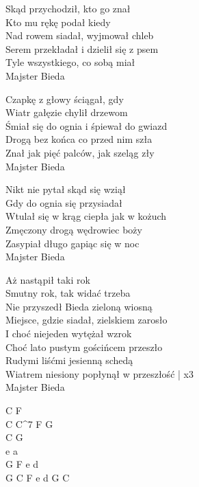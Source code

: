 
\begin{text}
    Skąd przychodził, kto go znał\\
    Kto mu rękę podał kiedy\\
    Nad rowem siadał, wyjmował chleb\\
    Serem przekładał i dzielił się z psem\\
    Tyle wszystkiego, co sobą miał\\
    Majster Bieda

    Czapkę z głowy ściągał, gdy\\
    Wiatr gałęzie chylił drzewom\\
    Śmiał się do ognia i śpiewał do gwiazd\\
    Drogą bez końca co przed nim szła\\
    Znał jak pięć palców, jak szeląg zły\\
    Majster Bieda

    Nikt nie pytał skąd się wziął\\
    Gdy do ognia się przysiadał\\
    Wtulał się w krąg ciepła jak w kożuch\\
    Zmęczony drogą wędrowiec boży\\
    Zasypiał długo gapiąc się w noc\\
    Majster Bieda

    Aż nastąpił taki rok\\
    Smutny rok, tak widać trzeba\\
    Nie przyszedł Bieda zieloną wiosną\\
    Miejsce, gdzie siadał, zielskiem zarosło\\
    I choć niejeden wytężał wzrok\\
    Choć lato pustym gościńcem przeszło\\
    Rudymi liśćmi jesienną schedą\\
    Wiatrem niesiony popłynął w przeszłość | x3\\
    Majster Bieda
\end{text}
\begin{chord}
    C F\\
    C C^7 F G\\
    C G\\
    e a\\
    G F e d\\
    G C F e d G C
\end{chord}